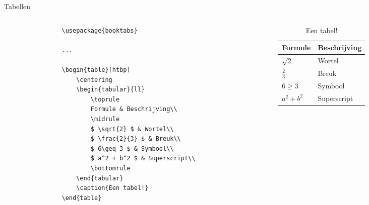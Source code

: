 \copyrightVincent

\begin{frame}[fragile]{Tabellen}
    \begin{columns}
        \begin{column}{0.5\textwidth}
            \begin{verbatim}
                \usepackage{booktabs}

                ...

                \begin{table}[htbp]
                    \centering
                    \begin{tabular}{ll}
                        \toprule
                        Formule & Beschrijving\\
                        \midrule
                        $ \sqrt{2} $ & Wortel\\
                        $ \frac{2}{3} $ & Breuk\\
                        $ 6\geq 3 $ & Symbool\\
                        $ a^2 + b^2 $ & Superscript\\
                        \bottomrule
                    \end{tabular}
                    \caption{Een tabel!}
                \end{table}
            \end{verbatim}
        \end{column}
        \begin{column}{0.5\textwidth}
            \begin{adjustbox}{frame=1pt 10pt}%
                \begin{minipage}{\textwidth-22pt}
                    \begin{table}[H]
                        \centering
                        \begin{tabular}{ll}
                            \toprule
                            Formule & Beschrijving\\
                            \midrule
                            $ \sqrt{2} $ & Wortel\\
                            $ \frac{2}{3} $ & Breuk\\
                            $ 6\geq 3 $ & Symbool\\
                            $ a^2 + b^2 $ & Superscript\\
                            \bottomrule
                        \end{tabular}
                        \caption{Een tabel!}
                    \end{table}
                    \vspace{-20pt}
                \end{minipage}
            \end{adjustbox}
        \end{column}
    \end{columns}
\end{frame}

